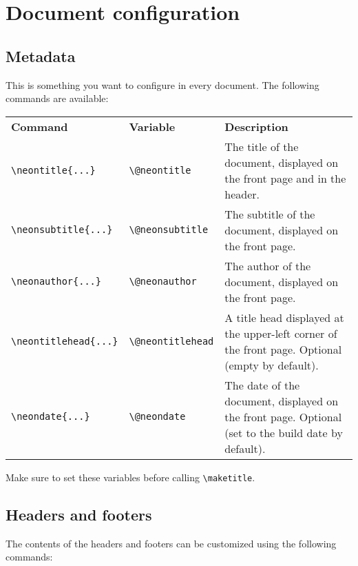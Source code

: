 \documentclass{neontex}
\begin{document}
	\section{Document configuration}
	\subsection{Metadata}
	This is something you want to configure in every document. The following commands are available:

	\begin{tabular}{ p{} p{} p{} }
		\textbf{Command} & \textbf{Variable} & \textbf{Description} \\
		\texttt{\textbackslash neontitle\{...\}} & \texttt{\textbackslash @neontitle} & The title of the document, displayed on the front page and in the header. \\
		\texttt{\textbackslash neonsubtitle\{...\}} & \texttt{\textbackslash @neonsubtitle} & The subtitle of the document, displayed on the front page. \\
		\texttt{\textbackslash neonauthor\{...\}} & \texttt{\textbackslash @neonauthor} & The author of the document, displayed on the front page. \\
		\texttt{\textbackslash neontitlehead\{...\}} & \texttt{\textbackslash @neontitlehead} & A title head displayed at the upper-left corner of the front page. Optional (empty by default). \\
		\texttt{\textbackslash neondate\{...\}} & \texttt{\textbackslash @neondate} & The date of the document, displayed on the front page. Optional (set to the build date by default). \\
	\end{tabular}

	Make sure to set these variables before calling \texttt{\textbackslash maketitle}.

	\subsection{Headers and footers}
	The contents of the headers and footers can be customized using the following commands:
\end{document}
